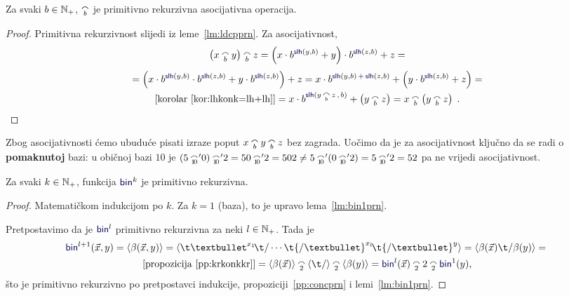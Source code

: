 \begin{propozicija}[{name=[primitivna rekurzivnost i asocijativnost konkatenacije]}]\label{pp:concprn}
Za svaki $b\in{\mathbb N}_+$, $\conc b$ je primitivno rekurzivna asocijativna operacija.
\end{propozicija}
\begin{proof}
Primitivna rekurzivnost slijedi iz leme~\ref{lm:ldcpprn}. Za asocijativnost,
\begin{multline}
    \left(x\conc b y\right)\conc b z=\left(x\cdot b^{\f{slh}(y,b)}+y\right)\cdot b^{\f{slh}(z,b)}+z=\\[1mm]
    =\left(x\cdot b^{\f{slh}(y,b)}\cdot b^{\f{slh}(z,b)}+y\cdot b^{\f{slh}(z,b)}\right)+z=
    x\cdot b^{\f{slh}(y,b)\,+\,\f{slh}(z,b)}+\left(y\cdot b^{\f{slh}(z,b)}+z\right)=\\[-1mm]
	\text{[korolar~\ref{kor:lhkonk=lh+lh}]}{}=x\cdot b^{\f{slh}(y\,\conc{{\scriptscriptstyle b}}\,z\,,\,b)}+\left(y\conc b z\right)=x\conc b\left(y\conc b z\right)\text{\qedhere\;.}
\end{multline}
\end{proof}
Zbog asocijativnosti ćemo ubuduće pisati izraze poput $x\conc by\conc bz$ bez zagrada. Uočimo da je za asocijativnost ključno da se radi o \textbf{pomaknutoj} bazi: u običnoj bazi $10$ je $(5\conc{\!1\!0\!}\!'0)\conc{\!1\!0\!}\!'2=50\conc{\!1\!0\!}\!'2=502\ne5\conc{\!1\!0\!}\!'(0\conc{\!1\!0\!}\!'2)=5\conc{\!1\!0\!}\!'2=52$ pa ne vrijedi asocijativnost.

\begin{propozicija}[{name=[primitivna rekurzivnost višemjesnog binarnog kodiranja]}]\label{pp:binkprn}
Za svaki $k\in{\mathbb N}_+$, funkcija $\f{bin}^k$ je primitivno rekurzivna.
\end{propozicija}
\begin{proof}
Matematičkom indukcijom po $k$. Za $k=1$ (baza), to je upravo lema~\ref{lm:bin1prn}.

	Pretpostavimo da je $\f{bin}^l$ primitivno rekurzivna za neki $l\in{\mathbb N}_+$. Tada je
\begin{multline}
    \f{bin}^{l+1}(\vec x,y)=
    \kr{\beta(\vec x,y)}=
	\kr{\t\textbullet^{x_1}\!\t/\dotsm\t{/\textbullet}^{x_l}\!\t{/\textbullet}^y}=
    \kr{\beta(\vec x)\t/\beta(y)}={}\\
    \text{[propozicija~\ref{pp:krkonkkr}]}{}=\kr{\beta(\vec x)}\conc 2\kr{\t/}\conc 2\kr{\beta(y)}=
    \f{bin}^l(\vec x)\conc22\conc2\f{bin}^1(y)\text,
\end{multline}
što je primitivno rekurzivno po pretpostavci indukcije, propoziciji~\ref{pp:concprn} i lemi~\ref{lm:bin1prn}.
\end{proof}

